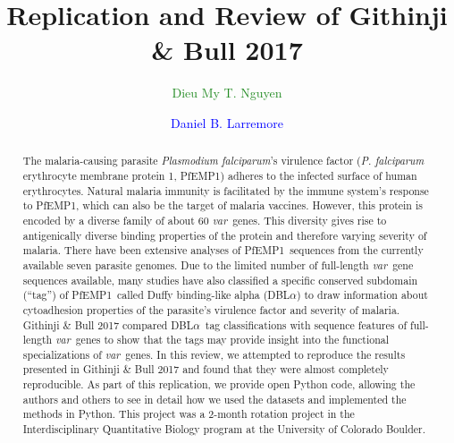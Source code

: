 \documentclass[10pt,twocolumn,superscriptaddress]{revtex4-1}
\newcommand{\dieumy}[1]{\textcolor{ForestGreen}{#1}}
\newcommand{\dan}[1]{\textcolor{blue}{#1}}
\newcommand{\var}{{\it var}\xspace}
\newcommand{\pf}{{\it P. falciparum}\xspace}
\newcommand{\pfem}{{PfEMP1}\xspace}
\newcommand{\dbla}{{DBL$\alpha$}\xspace}
\newcommand{\paper}{{Githinji \& Bull 2017}\xspace}
\begin{document}
\author{\dieumy{Dieu My T. Nguyen}}
\author{\dan{Daniel B. Larremore}}
	

\title{Replication and Review of \paper}
\begin{abstract}
The malaria-causing parasite \textit{Plasmodium falciparum}'s virulence factor (\pf erythrocyte membrane protein 1, \pfem) adheres to the infected surface of human erythrocytes. Natural malaria immunity is facilitated by the immune system's response to \pfem, which can also be the target of malaria vaccines. However, this protein is encoded by a diverse family of about 60 \var\ genes. This diversity gives rise to antigenically diverse binding properties of the protein and therefore varying severity of malaria. There have been extensive analyses of \pfem\ sequences from the currently available seven parasite genomes. Due to the limited number of full-length \var\ gene sequences available, many studies have also classified a specific conserved subdomain (``tag'') of \pfem\ called Duffy binding-like alpha (\dbla) to draw information about cytoadhesion properties of the parasite's virulence factor and severity of malaria. \paper compared \dbla\ tag classifications with sequence features of full-length \var\ genes to show that the tags may provide insight into the functional specializations of \var\ genes. In this review, we attempted to reproduce the results presented in \paper and found that they were almost completely reproducible. As part of this replication, we provide open Python code, allowing the authors and others to see in detail how we used the datasets and implemented the methods in Python. This project was a 2-month rotation project in the Interdisciplinary Quantitative Biology program at the University of Colorado Boulder.  
\end{abstract}
\maketitle

\end{document}
